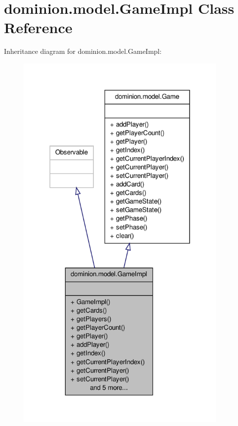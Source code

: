\hypertarget{classdominion_1_1model_1_1GameImpl}{\section{dominion.\-model.\-Game\-Impl \-Class \-Reference}
\label{classdominion_1_1model_1_1GameImpl}
}


\-Inheritance diagram for dominion.\-model.\-Game\-Impl\-:
\nopagebreak
\begin{figure}[H]
\begin{center}
\leavevmode
\includegraphics[width=292pt]{classdominion_1_1model_1_1GameImpl__inherit__graph}
\end{center}
\end{figure}


